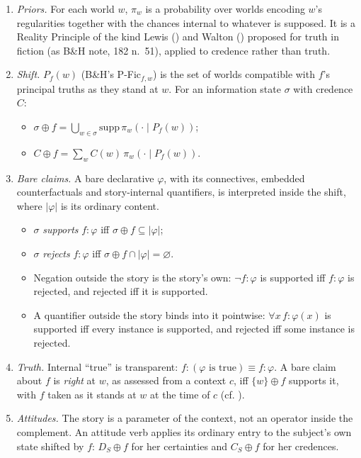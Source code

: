\documentclass[
  11pt,
  letterpaper,
  DIV=11,
  numbers=noendperiod,
  twoside]{scrartcl}
\providecommand{\tightlist}{%
  \setlength{\itemsep}{0pt}\setlength{\parskip}{0pt}}
\begin{document}
\begin{enumerate}
\def\labelenumi{\arabic{enumi}.}
\tightlist
\item
  \emph{Priors.} For each world \(w\), \(\pi_w\) is a probability over
  worlds encoding \(w\)'s regularities together with the chances
  internal to whatever is supposed. It is a Reality Principle of the
  kind Lewis () and Walton
  () proposed for truth in fiction (as
  B\&H note, 182 n.~51), applied to credence rather than truth.
\item
  \emph{Shift.} \(P_f(w)\) (B\&H's P-Fic\(_{f,w}\)) is the set of worlds
  compatible with \(f\)'s principal truths as they stand at \(w\). For
  an information state \(\sigma\) with credence \(C\):

  \begin{itemize}
  \tightlist
  \item
    \(\sigma \oplus f = \bigcup_{w \in \sigma} \mathrm{supp}\, \pi_w(\cdot \mid P_f(w))\);
  \item
    \(C \oplus f = \sum_w C(w)\, \pi_w(\cdot \mid P_f(w))\).
  \end{itemize}
\item
  \emph{Bare claims.} A bare declarative \(\varphi\), with its
  connectives, embedded counterfactuals and story-internal quantifiers,
  is interpreted inside the shift, where \(|\varphi|\) is its ordinary
  content.

  \begin{itemize}
  \tightlist
  \item
    \(\sigma\) \emph{supports} \(f{:}\varphi\) iff
    \(\sigma \oplus f \subseteq |\varphi|\);
  \item
    \(\sigma\) \emph{rejects} \(f{:}\varphi\) iff
    \(\sigma \oplus f \cap |\varphi| = \varnothing\).
  \item
    Negation outside the story is the story's own: \(\neg f{:}\varphi\)
    is supported iff \(f{:}\varphi\) is rejected, and rejected iff it is
    supported.
  \item
    A quantifier outside the story binds into it pointwise:
    \(\forall x\, f{:}\varphi(x)\) is supported iff every instance is
    supported, and rejected iff some instance is rejected.
  \end{itemize}
\item
  \emph{Truth.} Internal ``true'' is transparent:
  \(f{:}(\varphi \text{ is true}) \equiv f{:}\varphi\). A bare claim
  about \(f\) is \emph{right} at \(w\), as assessed from a context
  \(c\), iff \(\{w\} \oplus f\) supports it, with \(f\) taken as it
  stands at \(w\) at the time of \(c\) (cf.
  ).
\item
  \emph{Attitudes.} The story is a parameter of the context, not an
  operator inside the complement. An attitude verb applies its ordinary
  entry to the subject's own state shifted by \(f\): \(D_S \oplus f\)
  for her certainties and \(C_S \oplus f\) for her credences.
\end{enumerate}
\end{document}
